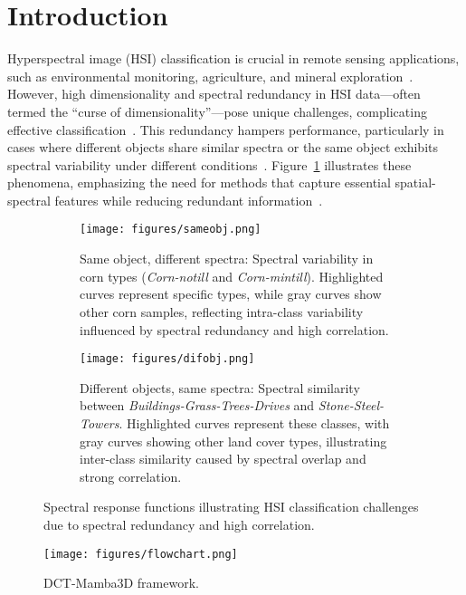 \section{Introduction}

Hyperspectral image (HSI) classification is crucial in remote sensing applications, such as environmental monitoring, agriculture, and mineral exploration~\cite{zhang2016deep, paoletti2019deep}. However, high dimensionality and spectral redundancy in HSI data—often termed the “curse of dimensionality”—pose unique challenges, complicating effective classification~\cite{he2017recent, li2013spectral}. This redundancy hampers performance, particularly in cases where different objects share similar spectra or the same object exhibits spectral variability under different conditions~\cite{theiler2019spectral, yao2024spectralmamba}. Figure~\ref{fig:challenges} illustrates these phenomena, emphasizing the need for methods that capture essential spatial-spectral features while reducing redundant information~\cite{li2024latent,deng2023psrt}.

\begin{figure}[H]
    \centering
    \begin{subfigure}[b]{1\linewidth}
        \texttt{[image: figures/sameobj.png]}
        \caption{Same object, different spectra: Spectral variability in corn types (\textit{Corn-notill} and \textit{Corn-mintill}). Highlighted curves represent specific types, while gray curves show other corn samples, reflecting intra-class variability influenced by spectral redundancy and high correlation.}
    \end{subfigure}
    \vfill
    \begin{subfigure}[b]{1\linewidth}
        \texttt{[image: figures/difobj.png]}
        \caption{Different objects, same spectra: Spectral similarity between \textit{Buildings-Grass-Trees-Drives} and \textit{Stone-Steel-Towers}. Highlighted curves represent these classes, with gray curves showing other land cover types, illustrating inter-class similarity caused by spectral overlap and strong correlation.}
    \end{subfigure}
    \caption{Spectral response functions illustrating HSI classification challenges due to spectral redundancy and high correlation.}
    \label{fig:challenges}
\end{figure}
\begin{figure*}[t]
    \centering
    \texttt{[image: figures/flowchart.png]}
    \caption{DCT-Mamba3D framework.}
    \label{fig:dct-mamba3d-flowchart}
\end{figure*}

